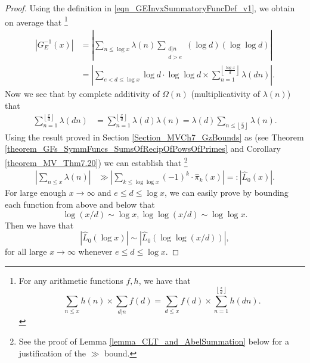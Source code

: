 \documentclass[11pt,reqno,a4letter]{article}
\numberwithin{figure}{section}
\numberwithin{table}{section}
\newcommand{\cf}{\textit{cf.\ }}
\newcommand{\Floor}[2]{\ensuremath{\left\lfloor \frac{#1}{#2} \right\rfloor}}
\theoremstyle{plain}
\numberwithin{theorem}{section}
\theoremstyle{definition}
\begin{document}
\begin{proof} 
Using the definition in \eqref{eqn_GEInvxSummatoryFuncDef_v1}, we obtain on average that \footnote{ 
     For any arithmetic functions $f,h$, we have that \cite[\cf \S 3.10; \S 3.12]{APOSTOLANUMT} 
     \[
     \sum_{n \leq x} h(n) \times \sum_{d|n} f(d) = \sum_{d \leq x} f(d) \times \sum_{n=1}^{\Floor{x}{d}} h(dn). 
     \] 
}
\begin{align*} 
\left\lvert G_E^{-1}(x) \right\rvert & = 
     \left\lvert \sum_{n \leq \log x} \lambda(n) 
     \sum_{\substack{d|n \\ d > e}} (\log d) (\log\log d) \right\rvert \\ 
     & = \left\lvert \sum_{e < d \leq \log x} \log d \cdot \log\log d \times 
     \sum_{n=1}^{\Floor{\log x}{d}} \lambda(dn) \right\rvert. 
\end{align*} 
Now we see that by complete additivity of $\Omega(n)$ 
(multiplicativity of $\lambda(n)$) that 
\begin{align*} 
\sum_{n=1}^{\Floor{x}{d}} \lambda(dn) & = \sum_{n=1}^{\Floor{x}{d}} \lambda(d) \lambda(n) 
     = \lambda(d) \sum_{n \leq \Floor{x}{d}} \lambda(n). 
\end{align*} 
Using the result proved in Section \ref{Section_MVCh7_GzBounds} as 
(see Theorem \ref{theorem_GFs_SymmFuncs_SumsOfRecipOfPowsOfPrimes} and 
Corollary \ref{theorem_MV_Thm7.20})
we can establish that \footnote{ 
     See the proof of Lemma \ref{lemma_CLT_and_AbelSummation} below for 
     a justification of the $\gg$ bound. 
}
\begin{align*} 
\left\lvert \sum_{n \leq x} \lambda(n) \right\rvert & \gg 
     \left\lvert \sum_{k \leq \log\log x} (-1)^k \cdot \widehat{\pi}_k(x) \right\rvert 
     =: \left\lvert \widehat{L}_0(x) \right\rvert. 
\end{align*} 
For large enough $x \rightarrow \infty$ and $e \leq d \leq \log x$, 
we can easily prove by bounding each function from above and below that 
\[
\log(x/d) \sim \log x, \log\log(x/d) \sim \log\log x.  
\] 
Then we have that 
$$\left\lvert \widehat{L}_0(\log x) \right\rvert \sim 
 \left\lvert \widehat{L}_0(\log\log (x/d)) \right\rvert,$$ 
for all large $x \rightarrow \infty$ whenever $e \leq d \leq \log x$. 


\end{proof}
\end{document}
